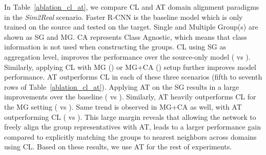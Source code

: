 \documentclass[10pt,twocolumn,letterpaper]{article}
\DeclareRobustCommand{\Tableref}[1]{Table~\ref{#1}}
\begin{document}
In Table~\ref{ablation_cl_at}, we compare CL and AT domain alignment paradigms in the \emph{Sim2Real} scenario.
Faster R-CNN is the baseline model which is only trained on the source and tested on the target. Single and Multiple Group(s) are shown as SG and MG. CA represents Class Agnostic, which means that class information is not used when constructing the groups. 
CL using SG as aggregation level, improves the performance over the source-only model ( vs ).
Similarly, applying CL with MG () or MG+CA () setup further improves  model performance.
AT  outperforms CL in each of these three scenarios (fifth to seventh rows of \Tableref{ablation_cl_at}).
Applying AT on the SG results in a large improvements over the baseline ( vs ).
Similarly, AT heavily outperforms CL for the MG setting ( vs ). 
Same trend is observed in MG+CA as well, with AT outperforming CL ( vs ). 
This large margin reveals that allowing the network to freely align the group representatives with AT, leads to a larger performance gain compared to explicitly matching the groups to nearest neighbors across domains using CL. 
Based on these results, we use AT for the rest of experiments.


\begin{table}
    \centering
    \vspace{1mm}
    \caption{\textbf{Sim2Real:} Analyzing the choice of alignment mechanism, comparing adversarial training against contrastive learning across different aggregation conditions (SG: Single Group, MG: Multiple Groups, CA: Class Agnostic ). Note that all results here only use instance level alignment.} \label{ablation_cl_at}
\end{table}
\end{document}
